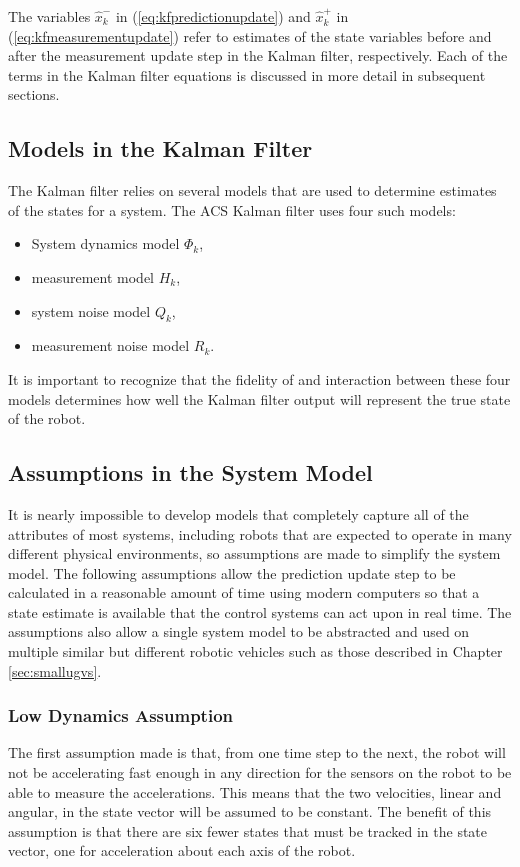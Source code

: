 The variables $\hat{x}_k^-$ in (\ref{eq:kfpredictionupdate}) and $\hat{x}_k^+$ in (\ref{eq:kfmeasurementupdate}) refer to estimates of the state variables before and after the measurement update step in the Kalman filter, respectively. Each of the terms in the Kalman filter equations is discussed in more detail in subsequent sections.

\subsection{Models in the Kalman Filter}
\label{sec:kfModels}
The Kalman filter relies on several models that are used to determine estimates of the states for a system. The ACS Kalman filter uses four such models:
\begin{itemize}
\item System dynamics model $\Phi_k$,
\item measurement model $H_k$,
\item system noise model $Q_k$,
\item measurement noise model $R_k$.
\end{itemize}

It is important to recognize that the fidelity of and interaction between these four models determines how well the Kalman filter output will represent the true state of the robot.

\subsection{Assumptions in the System Model}
\label{sec:kfAssumptions}
It is nearly impossible to develop models that completely capture all of the attributes of most systems, including robots that are expected to operate in many different physical environments, so assumptions are made to simplify the system model. The following assumptions allow the prediction update step to be calculated in a reasonable amount of time using modern computers so that a state estimate is available that the control systems can act upon in real time. The assumptions also allow a single system model to be abstracted and used on multiple similar but different robotic vehicles such as those described in Chapter \ref{sec:smallugvs}.

\subsubsection{Low Dynamics Assumption}
\label{sec:kfLowDynamicsAssumption}
The first assumption made is that, from one time step to the next, the robot will not be accelerating fast enough in any direction for the sensors on the robot to be able to measure the accelerations. This means that the two velocities, linear and angular, in the state vector will be assumed to be constant. The benefit of this assumption is that there are six fewer states that must be tracked in the state vector, one for acceleration about each axis of the robot.

